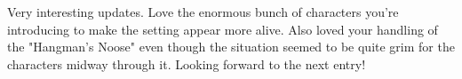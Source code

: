 Very interesting updates. Love the enormous bunch of characters you're introducing to make the setting appear more alive. Also loved your handling of the "Hangman's Noose" even though the situation seemed to be quite grim for the characters midway through it. Looking forward to the next entry!\\

